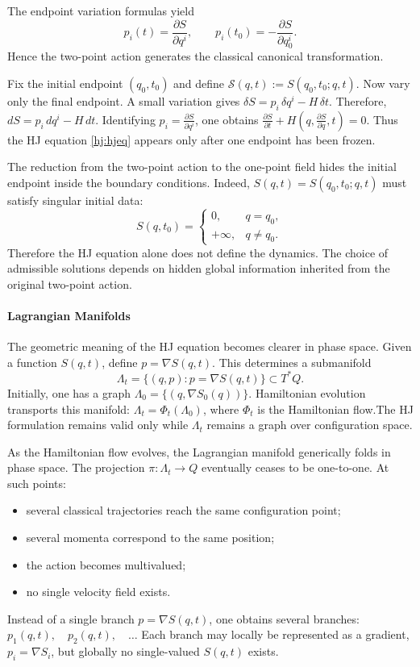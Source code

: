 The endpoint variation formulas yield
\begin{equation}
p_i(t)=\frac{\partial S}{\partial q^i},
\qquad
p_i(t_0)=-\frac{\partial S}{\partial q_0^i}.
\label{hj:endpoint}
\end{equation}
Hence the two-point action generates the classical canonical transformation.

Fix the initial endpoint $(q_0,t_0)$ and define
$\mathcal S(q,t):=S(q_0,t_0;q,t)$.
Now vary only the final endpoint. A small variation gives
$\delta S=p_i\,\delta q^i - H\,\delta t$.
Therefore,
$dS = p_i\,dq^i - H\,dt$.
Identifying $p_i=\frac{\partial S}{\partial q^i}$,
one obtains $\frac{\partial S}{\partial t}+
H\left(q,\frac{\partial S}{\partial q},t\right)=0$.
Thus the HJ equation \eqref{hj:hjeq} appears only after one endpoint has been
frozen.

The reduction from the two-point action to the one-point field hides the
initial endpoint inside the boundary conditions.
Indeed, $S(q,t)=S(q_0,t_0;q,t)$
must satisfy singular initial data:
\begin{equation}
S(q,t_0)=
\begin{cases}
0, & q=q_0,\\
+\infty, & q\neq q_0.
\end{cases}
\end{equation}
Therefore the HJ equation alone does not define the dynamics. The choice of
admissible solutions depends on hidden global information inherited from the
original two-point action.


\paragraph{Lagrangian Manifolds}
The geometric meaning of the HJ equation becomes clearer in phase space.
Given a function $S(q,t)$, define $p=\nabla S(q,t)$.
This determines a submanifold 
\[\Lambda_t=\{(q,p):p=\nabla S(q,t)\}\subset T^*Q.\]
Initially, one has a graph $\Lambda_0=\{(q,\nabla S_0(q))\}$.
Hamiltonian evolution transports this manifold: $\Lambda_t=\Phi_t(\Lambda_0)$,
where $\Phi_t$ is the Hamiltonian flow.The HJ formulation remains valid only 
while $\Lambda_t$ remains a graph over configuration space.

As the Hamiltonian flow evolves, the Lagrangian manifold generically folds in
phase space. The projection $\pi:\Lambda_t\to Q$ eventually ceases to be
one-to-one. At such points:
\begin{itemize}
\item several classical trajectories reach the same configuration point;
\item several momenta correspond to the same position;
\item the action becomes multivalued;
\item no single velocity field exists.
\end{itemize}
Instead of a single branch $p=\nabla S(q,t)$,
one obtains several branches: $p_1(q,t),\quad p_2(q,t),\quad \dots$
Each branch may locally be represented as a gradient,
$p_i=\nabla S_i$, but globally no single-valued $S(q,t)$ exists.

